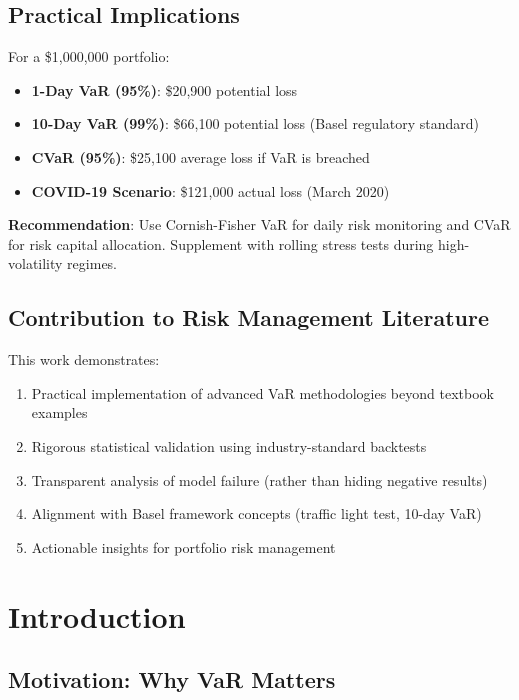\documentclass[12pt,a4paper]{article}
\begin{document}
\subsection{Practical Implications}

For a \$1,000,000 portfolio:
\begin{itemize}
    \item \textbf{1-Day VaR (95\%)}: \$20,900 potential loss
    \item \textbf{10-Day VaR (99\%)}: \$66,100 potential loss (Basel regulatory standard)
    \item \textbf{CVaR (95\%)}: \$25,100 average loss if VaR is breached
    \item \textbf{COVID-19 Scenario}: \$121,000 actual loss (March 2020)
\end{itemize}

\textbf{Recommendation}: Use Cornish-Fisher VaR for daily risk monitoring and CVaR for risk capital allocation. Supplement with rolling stress tests during high-volatility regimes.

\subsection{Contribution to Risk Management Literature}

This work demonstrates:
\begin{enumerate}
    \item Practical implementation of advanced VaR methodologies beyond textbook examples
    \item Rigorous statistical validation using industry-standard backtests
    \item Transparent analysis of model failure (rather than hiding negative results)
    \item Alignment with Basel framework concepts (traffic light test, 10-day VaR)
    \item Actionable insights for portfolio risk management
\end{enumerate}

\newpage
\section{Introduction}

\subsection{Motivation: Why VaR Matters}
\end{document}
